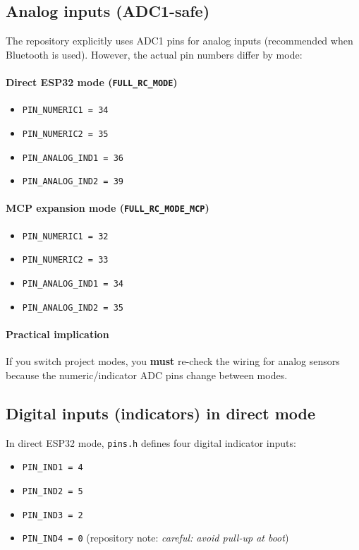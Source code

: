 \subsection{Analog inputs (ADC1-safe)}
The repository explicitly uses ADC1 pins for analog inputs (recommended when Bluetooth is used).
However, the actual pin numbers differ by mode:

\paragraph{Direct ESP32 mode (\texttt{FULL\_RC\_MODE})}
\begin{itemize}
    \item \texttt{PIN\_NUMERIC1 = 34}
    \item \texttt{PIN\_NUMERIC2 = 35}
    \item \texttt{PIN\_ANALOG\_IND1 = 36}
    \item \texttt{PIN\_ANALOG\_IND2 = 39}
\end{itemize}

\paragraph{MCP expansion mode (\texttt{FULL\_RC\_MODE\_MCP})}
\begin{itemize}
    \item \texttt{PIN\_NUMERIC1 = 32}
    \item \texttt{PIN\_NUMERIC2 = 33}
    \item \texttt{PIN\_ANALOG\_IND1 = 34}
    \item \texttt{PIN\_ANALOG\_IND2 = 35}
\end{itemize}

\paragraph{Practical implication}
If you switch project modes, you \textbf{must} re-check the wiring for analog sensors because the numeric/indicator
ADC pins change between modes.

\subsection{Digital inputs (indicators) in direct mode}
In direct ESP32 mode, \texttt{pins.h} defines four digital indicator inputs:

\begin{itemize}
    \item \texttt{PIN\_IND1 = 4}
    \item \texttt{PIN\_IND2 = 5}
    \item \texttt{PIN\_IND3 = 2}
    \item \texttt{PIN\_IND4 = 0} \quad (repository note: \emph{careful: avoid pull-up at boot})
\end{itemize}

